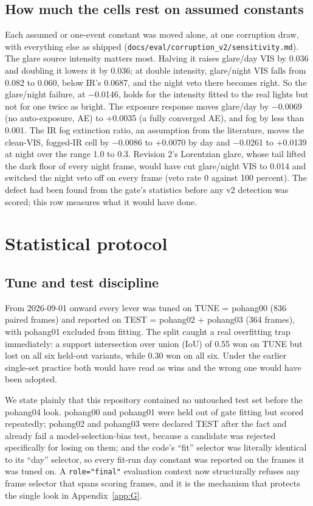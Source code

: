 \documentclass[journal,onecolumn]{IEEEtran}
\begin{document}
\subsection{How much the cells rest on assumed constants}\label{app:B.2}
Each assumed or one-event constant was moved alone, at one corruption draw, with everything else as shipped (\texttt{docs/\allowbreak{}eval/\allowbreak{}corruption\_\allowbreak{}v2/\allowbreak{}sensitivity.md}). The glare source intensity matters most. Halving it raises glare/day VIS by 0.036 and doubling it lowers it by 0.036; at double intensity, glare/night VIS falls from 0.082 to 0.060, below IR's 0.0687, and the night veto there becomes right. So the glare/night failure, at $-$0.0146, holds for the intensity fitted to the real lights but not for one twice as bright. The exposure response moves glare/day by $-$0.0069 (no auto-exposure, AE) to +0.0035 (a fully converged AE), and fog by less than 0.001. The IR fog extinction ratio, an assumption from the literature, moves the clean-VIS, fogged-IR cell by $-$0.0086 to +0.0070 by day and $-$0.0261 to +0.0139 at night over the range 1.0 to 0.3. Revision 2's Lorentzian glare, whose tail lifted the dark floor of every night frame, would have cut glare/night VIS to 0.014 and switched the night veto off on every frame (veto rate 0 against 100 percent). The defect had been found from the gate's statistics before any v2 detection was scored; this row measures what it would have done.

\FloatBarrier
\section{Statistical protocol}\label{app:C}
\subsection{Tune and test discipline}\label{app:C.1}
From 2026-09-01 onward every lever was tuned on TUNE = pohang00 (836 paired frames) and reported on TEST = pohang02 + pohang03 (364 frames), with pohang01 excluded from fitting. The split caught a real overfitting trap immediately: a support intersection over union (IoU) of 0.55 won on TUNE but lost on all six held-out variants, while 0.30 won on all six. Under the earlier single-set practice both would have read as wins and the wrong one would have been adopted.

We state plainly that this repository contained no untouched test set before the pohang04 look. pohang00 and pohang01 were held out of gate fitting but scored repeatedly; pohang02 and pohang03 were declared TEST after the fact and already fail a model-selection-bias test, because a candidate was rejected specifically for losing on them; and the code's ``fit'' selector was literally identical to its ``day'' selector, so every fit-run day constant was reported on the frames it was tuned on. A \texttt{role="final"} evaluation context now structurally refuses any frame selector that spans scoring frames, and it is the mechanism that protects the single look in Appendix~\ref{app:G}.
\end{document}
